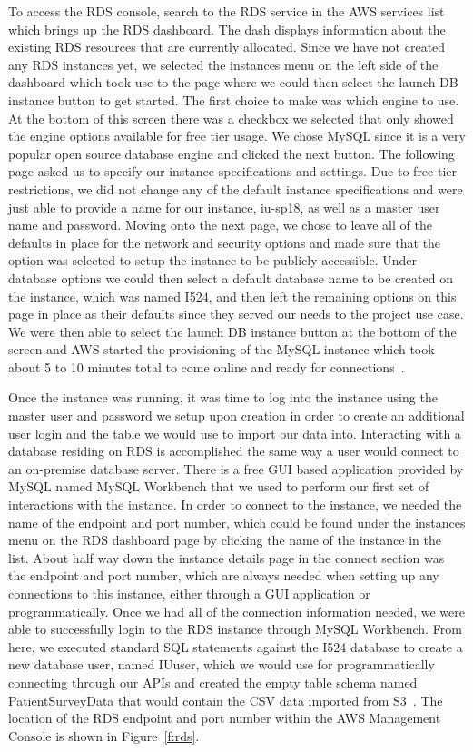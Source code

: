 To access the RDS console, search to the RDS service in the AWS services list 
which brings up the RDS dashboard. The dash displays information about the 
existing RDS resources that are currently allocated. Since we have not created 
any RDS instances yet, we selected the instances menu on the left side of the 
dashboard which took use to the page where we could then select the launch DB 
instance button to get started. The first choice to make was which engine to 
use. At the bottom of this screen there was a checkbox we selected that only 
showed the engine options available for free tier usage. We chose MySQL since 
it is a very popular open source database engine and clicked the next button. 
The following page asked us to specify our instance specifications and 
settings. Due to free tier restrictions, we did not change any of the default 
instance specifications and were just able to provide a name for our instance, 
iu-sp18, as well as a master user name and password. Moving onto the next 
page, we chose to leave all of the defaults in place for the network and 
security options and made sure that the option was selected to setup the 
instance to be publicly accessible. Under database options we could then 
select a default database name to be created on the instance, which was named 
I524, and then left the remaining options on this page in place as their 
defaults since they served our needs to the project use case. We were then 
able to select the launch DB instance button at the bottom of the screen and 
AWS started the provisioning of the MySQL instance which took about 5 to 10 
minutes total to come online and ready for 
connections~\cite{hid-sp18-521-rds-mysql}. 

Once the instance was running, it was time to log into the instance using the 
master user and password we setup upon creation in order to create an 
additional user login and the table we would use to import our data into. 
Interacting with a database residing on RDS is accomplished the same way a 
user would connect to an on-premise database server. There is a free GUI based 
application provided by MySQL named MySQL Workbench that we used to perform 
our first set of interactions with the instance. In order to connect to the 
instance, we needed the name of the endpoint and port number, which could be 
found under the instances menu on the RDS dashboard page by clicking the name 
of the instance in the list. About half way down the instance details page in 
the connect section was the endpoint and port number, which are always needed 
when setting up any connections to this instance, either through a GUI 
application or programmatically. Once we had all of the connection information 
needed, we were able to successfully login to the RDS instance through MySQL 
Workbench. From here, we executed standard SQL statements against the I524 
database to create a new database user, named IUuser, which we would use for 
programmatically connecting through our APIs and created the empty table 
schema named PatientSurveyData that would contain the CSV data imported 
from S3~\cite{hid-sp18-521-rds-mysql}. The location of the RDS endpoint and
port number within the AWS Management Console is shown in Figure~\ref{f:rds}.

